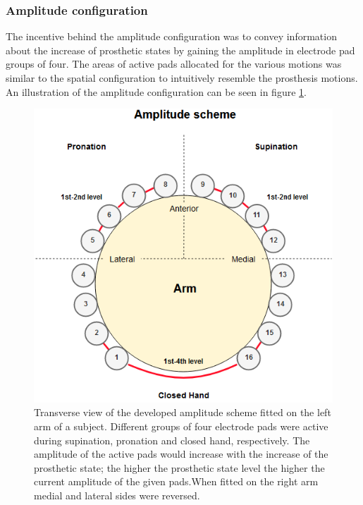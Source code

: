 \subsubsection{Amplitude configuration}
The incentive behind the amplitude configuration was to convey information about the increase of prosthetic states by gaining the amplitude in electrode pad groups of four.
The areas of active pads allocated for the various motions was similar to the spatial configuration to intuitively resemble the prosthesis motions. An illustration of the amplitude configuration can be seen in figure \ref{fig:pa:amplitude}. 
 \begin{figure}[h]                 
	\includegraphics[width=.9\textwidth]{figures/El_array_amplitude}  
	\caption{Transverse view of the developed amplitude scheme fitted on the left arm of a subject. Different groups of four electrode pads were active during supination, pronation and closed hand, respectively. The amplitude of the active pads would increase with the increase of the prosthetic state; the higher the prosthetic state level the higher the current amplitude of the given pads.When fitted on the right arm medial and lateral sides were reversed.}
	\label{fig:pa:amplitude} 
\end{figure}

